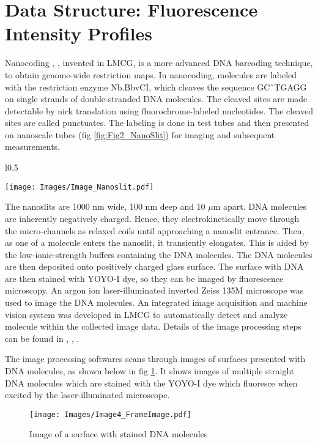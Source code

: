 \section{Data Structure: Fluorescence Intensity Profiles} \label{Ch2}

Nanocoding \cite{Jo_etal_2007_PNAS}, \cite{Jo_etal_2009}, invented in LMCG, is a more advanced DNA barcoding technique, to obtain genome-wide restriction maps. In nanocoding, molecules are labeled with the restriction enzyme Nb.BbvCI, which cleaves the sequence GC\^\ TGAGG on single strands of double-stranded DNA molecules. The cleaved sites are made detectable by nick translation using fluorochrome-labeled nucleotides. The cleaved sites are called punctuates. The labeling is done in test tubes and then presented on nanoscale tubes (fig \ref{fig:Fig2_NanoSlit}) for imaging and subsequent measurements. 
\begin{wrapfigure}{l}{0.5\textwidth}
\begin{center}
\texttt{[image: Images/Image\_Nanoslit.pdf]}
\end{center}
\caption{Nanoslits where DNA molecules are presented}
\label{fig:Fig2_NanoSlit}
\end{wrapfigure}
The nanoslits are 1000 nm wide, 100 nm deep and 10 $\mu$m apart. DNA molecules are inherently negatively charged. Hence, they electrokinetically move through the micro-channels as relaxed coils until approaching a nanoslit entrance. Then, as one of a molecule enters the nanoslit, it transiently elongates. This is aided by the low-ionic-strength buffers containing the DNA molecules. The DNA molecules are then deposited onto positively charged glass surface. The surface with DNA are then stained with YOYO-I dye, so they can be imaged by fluorescence microscopy. An argon ion laser-illuminated inverted Zeiss 135M microscope was used to image the DNA molecules. An integrated image acquisition and machine vision system was developed in LMCG to automatically detect and analyze molecule within the collected image data. Details of the image processing steps can be found in \cite{Dimalanta_etal_2004_AnalChem}, \cite{Jo_etal_2007_PNAS}, \cite{Ravindran_Gupta_2015_GigaScience}. 

The image processing softwares scans through images of surfaces presented with DNA molecules, as shown below in fig \ref{fig:Fig2_FrameImage}. It shows images of multiple straight DNA molecules which are stained with the YOYO-I dye which fluoresce when excited by the laser-illuminated microscope.  
\begin{figure}[H]
\begin{center}
\texttt{[image: Images/Image4\_FrameImage.pdf]}
\end{center}
\caption{Image of a surface with stained DNA molecules}
\label{fig:Fig2_FrameImage}
\end{figure}

